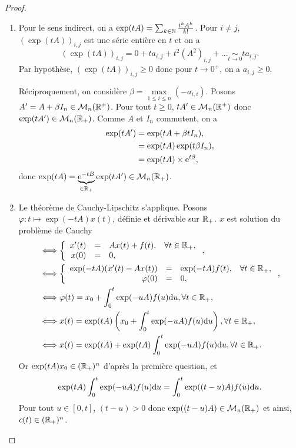 \documentclass[12pt]{article}
\begin{document}
\begin{proof}
	\phantom{}
	\begin{enumerate}
		\item Pour le sens indirect, on a $\exp(tA)=\sum_{k\in\mathbb{N}}\frac{t^{k}A^{k}}{k!}$. Pour $i\neq j$, $(\exp(tA))_{i,j}$ est une série entière en $t$ et on a 
		\begin{equation}
			(\exp(tA))_{i,j}=0+t a_{i,j}+t^{2}(A^{2})_{i,j}+\dots\underset{t\to0}{\sim}t a_{i,j}.
		\end{equation}
		Par hypothèse, $(\exp(tA))_{i,j}\geqslant 0$ donc pour $t\to0^{+}$, on a $a_{i,j}\geqslant0$.
		
		Réciproquement, on considère $\beta=\max\limits_{1\leqslant i\leqslant n}(-a_{i,i})$. Posons $A'=A+\beta I_n\in\mathcal{M}_n(\mathbb{R}^{+})$. Pour tout $t\geqslant 0$, $tA'\in\mathcal{M}_n(\mathbb{R}^{+})$ donc $\exp(tA')\in\mathcal{M}_n(\mathbb{R}_{+})$. Comme $A$ et $I_n$ commutent, on a 
		\begin{align}
			\exp(tA')
			&=\exp(tA+\beta tI_n),\\
			&=\exp(tA)\exp(t\beta I_n),\\
			&=\exp(tA)\times\mathrm{e}^{t\beta},
		\end{align}
		donc $\exp(tA)=\underbrace{\mathrm{e}^{-t B}}_{\in\mathbb{R}_{+}}\exp(tA')\in\mathcal{M}_n(\mathbb{R}_{+})$.

		\item Le théorème de Cauchy-Lipschitz s'applique. Posons $\varphi\colon t\mapsto\exp(-t A)x(t)$, définie et dérivable sur $\mathbb{R}_{+}$. $x$ est solution du problème de Cauchy
		\begin{align}
			&\Longleftrightarrow 
			\left\lbrace
				\begin{array}[]{rcll}
					x'(t)&=&A x(t)+f(t), &\forall t\in\R_{+},\\
					x(0)&=&0,
				\end{array}
			\right.,\\
			&\Longleftrightarrow 
			\left\lbrace
				\begin{array}[]{rcll}
					\exp(-tA)(x'(t)-Ax(t))&=&\exp(-tA)f(t), &\forall t\in\R_{+},\\
					\varphi(0)&=&0,
				\end{array}
			\right.,\\
			&\Longleftrightarrow 
			\varphi(t)=x_0+\int_{0}^{t}\exp(-u A)f(u)\d u,\forall t\in\R_{+},\\
			&\Longleftrightarrow 
			x(t)=\exp(tA)\left(x_0+\int_{0}^{t}\exp(-u A)f(u)\d u\right),\forall t\in\R_{+},\\
			&\Longleftrightarrow 
			x(t)=\exp(tA)+\exp(tA)\int_{0}^{t}\exp(-u A)f(u)\d u,\forall t\in\R_{+}.
		\end{align}
		Or $\exp(t A)x_0\in(\mathbb{R}_{+})^{n}$ d'après la première question, et 
		\begin{equation}
			\exp(tA)\int_{0}^{t}\exp(-u A)f(u)\mathrm{d} u=\int_{0}^{t}\exp((t-u)A)f(u)\mathrm{d} u.
		\end{equation}
		Pour tout $u\in[0,t]$, $(t-u)>0$ donc $\exp((t-u)A)\in\mathcal{M}_n(\mathbb{R}_{+})$ et ainsi, $c(t)\in(\mathbb{R}_{+})^{n}$.
	\end{enumerate}
\end{proof}
\end{document}
